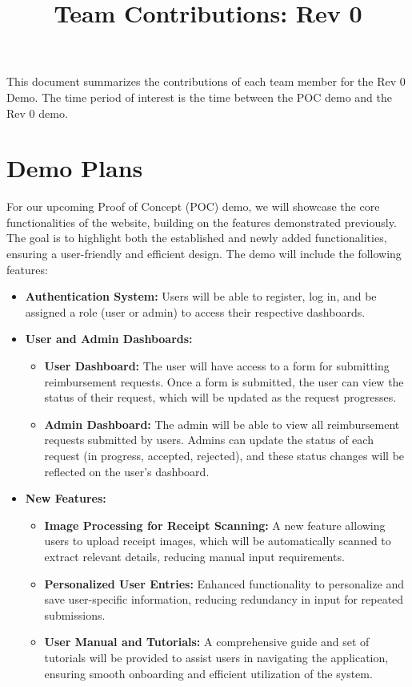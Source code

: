 \documentclass{article}
\title{Team Contributions: Rev 0\\\progname}
\author{\authname}
\date{}
\begin{document}
\maketitle

This document summarizes the contributions of each team member for the Rev 0
Demo.  The time period of interest is the time between the POC demo and the Rev
0 demo.

\section{Demo Plans}

For our upcoming Proof of Concept (POC) demo, we will showcase the core functionalities of the website, building on the features demonstrated previously. The goal is to highlight both the established and newly added functionalities, ensuring a user-friendly and efficient design. The demo will include the following features:

\begin{itemize}
    \item \textbf{Authentication System:} Users will be able to register, log in, and be assigned a role (user or admin) to access their respective dashboards.
    
    \item \textbf{User and Admin Dashboards:}
    \begin{itemize}
        \item \textbf{User Dashboard:} The user will have access to a form for submitting reimbursement requests. Once a form is submitted, the user can view the status of their request, which will be updated as the request progresses.
        \item \textbf{Admin Dashboard:} The admin will be able to view all reimbursement requests submitted by users. Admins can update the status of each request (in progress, accepted, rejected), and these status changes will be reflected on the user's dashboard.
    \end{itemize}
    
    \item \textbf{New Features:}
    \begin{itemize}
        \item \textbf{Image Processing for Receipt Scanning:} A new feature allowing users to upload receipt images, which will be automatically scanned to extract relevant details, reducing manual input requirements.
        \item \textbf{Personalized User Entries:} Enhanced functionality to personalize and save user-specific information, reducing redundancy in input for repeated submissions.
        \item \textbf{User Manual and Tutorials:} A comprehensive guide and set of tutorials will be provided to assist users in navigating the application, ensuring smooth onboarding and efficient utilization of the system.
    \end{itemize}
\end{itemize}
\end{document}
